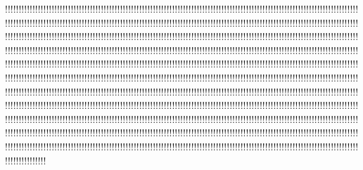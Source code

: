 !!!!!!!!!!!!!!!!!!!!!!!!!!!!!!!!!!!!!!!!!!!!!!!!!!!!!!!!!!!!!!!!!!!!!!!!!!!!!!!!!!!!!!!!!!!!!!!!!!!!!!!!!!!!!!!!!!!!!!!!!!!!!!!!!!!!!!!!!!!!!!!!!!!!!!!!!!!!!!!!!!!!!!!!!!!!!!!!!!!!!!!!!!!!!!!!!!!!!!!!!!!!!!!!!!!!!!!!!!!!!!!!!!!!!!!!!!!!!!!!!!!!!!!!!!!!!!!!!!!!!!!!!!!!!!!!!!!!!!!!!!!!!!!!!!!!!!!!!!!!!!!!!!!!!!!!!!!!!!!!!!!!!!!!!!!!!!!!!!!!!!!!!!!!!!!!!!!!!!!!!!!!!!!!!!!!!!!!!!!!!!!!!!!!!!!!!!!!!!!!!!!!!!!!!!!!!!!!!!!!!!!!!!!!!!!!!!!!!!!!!!!!!!!!!!!!!!!!!!!!!!!!!!!!!!!!!!!!!!!!!!!!!!!!!!!!!!!!!!!!!!!!!!!!!!!!!!!!!!!!!!!!!!!!!!!!!!!!!!!!!!!!!!!!!!!!!!!!!!!!!!!!!!!!!!!!!!!!!!!!!!!!!!!!!!!!!!!!!!!!!!!!!!!!!!!!!!!!!!!!!!!!!!!!!!!!!!!!!!!!!!!!!!!!!!!!!!!!!!!!!!!!!!!!!!!!!!!!!!!!!!!!!!!!!!!!!!!!!!!!!!!!!!!!!!!!!!!!!!!!!!!!!!!!!!!!!!!!!!!!!!!!!!!!!!!!!!!!!!!!!!!!!!!!!!!!!!!!!!!!!!!!!!!!!!!!!!!!!!!!!!!!!!!!!!!!!!!!!!!!!!!!!!!!!!!!!!!!!!!!!!!!!!!!!!!!!!!!!!!!!!!!!!!!!!!!!!!!!!!!!!!!!!!!!!!!!!!!!!!!!!!!!!!!!!!!!!!!!!!!!!!!!!!!!!!!!!!!!!!!!!!!!!!!!!!!!!!!!!!!!!!!!!!!!!!!!!!!!!!!!!!!!!!!!!!!!!!!!!!!!!!!!!!!!!!!!!!!!!!!!!!!!!!!!!!!!!!!!!!!!!!!!!!!!!!!!!!!!!!!!!!!!!!!!!!!!!!!!!!!!!!!!!!!!!!!!!!!!!!!!!!!!!!!!!!!!!!!!!!!!!!!!!!!!!!!!!!!!!!!!!!!!!!!!!!!!!!!!!!!!!!!!!!!!!!!!!!!!!!!!!!!!!!!!!!!!!!!!!!!!!!!!!!!!!!!!!!!!!!!!!!!!!!!!!!!!!!!!!!!!!!!!!!!!!!!!!!!!!!!!!!!!!!!!!!!!!!!!!!!!!!!!!!!!!!!!!!!!!!!!!!!!!!!!!!!!!!!!!!!!!!!!!!!!!!!!!!!!!!!!!!!!!!!!!!!!!!!!!!!!!!!!!!!!!!!!!!!!!!!!!!!!!!!!!!!!!!!!!!!!!!!!!!!!!!!!!!!!!!!!!!!!!!!!!!!!!
%
%
